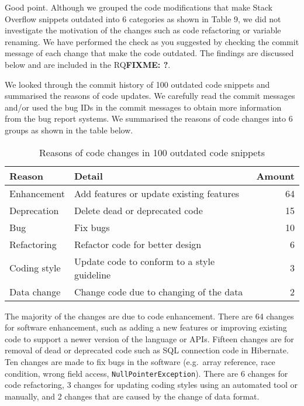 \documentclass[a4paper,twoside,10pt]{reviewresponse}
\newcommand\FIXME[1]{{\color{red}\textbf{FIXME: #1}}}
\begin{document}
		

Good point. Although we grouped the code modifications that make Stack Overflow snippets outdated into 6 categories as shown in Table 9, we did not investigate the motivation of the changes such as code refactoring or variable renaming. We have performed the check as you suggested by checking the commit message of each change that make the code outdated. The findings are discussed below and are included in the RQ\FIXME{?}.

We looked through the commit history of 100 outdated code snippets and summarised the reasons of code updates. We carefully read the commit messages and/or used the bug IDs in the commit messages to obtain more information from the bug report systems. We summarised the reasons of code changes into 6 groups as shown in the table below.

\begin{table}
	\centering
	\begin{tabular}{llr}
		\toprule
		Reason & Detail & Amount \\
		\midrule
		Enhancement & Add features or update existing features & 64 \\
		Deprecation & Delete dead or deprecated code & 15 \\
		Bug & Fix bugs & 10 \\
		Refactoring & Refactor code for better design & 6 \\
		Coding style & Update code to conform to a style guideline & 3 \\
		Data change & Change code due to changing of the data & 2 \\
		\bottomrule
	\end{tabular}
	\caption{Reasons of code changes in 100 outdated code snippets}
\end{table}

The majority of the changes are due to code enhancement. There are 64 changes for software enhancement, such as adding a new features or improving existing code to support a newer version of the language or APIs. Fifteen changes are for removal of dead or deprecated code such as SQL connection code in Hibernate. Ten changes are made to fix bugs in the software (e.g.~array reference, race condition, wrong field access, \texttt{NullPointerException}). There are 6 changes for code refactoring, 3 changes for updating coding styles using an automated tool or manually, and 2 changes that are caused by the change of data format.
\end{document}
